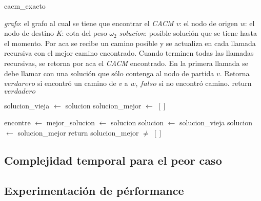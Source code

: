 \begin{algorithm}[!h]
\caption{cacm\_exacto} \label{exacto:pseudo}
\end{algorithm}
\begin{algorithmic}[1]
	\Require \emph{grafo}: el grafo al cual se tiene que encontrar el \emph{CACM}
	\Require \emph{v}: el nodo de origen
	\Require \emph{w}: el nodo de destino
	\Require \emph{K}: cota del peso $\omega_2$
	\Require \emph{solucion}: posible soluci\'on que se tiene hasta el momento. Por aca se recibe un camino posible y se actualiza en cada llamada recursiva con el mejor camino encontrado. Cuando terminen todas las llamadas recursivas, se retorna por aca el \emph{CACM} encontrado. En la primera llamada se debe llamar con una soluci\'on que s\'olo contenga al nodo de partida $v$.
	\Statex
	\Ensure Retorna $verdarero$ si encontr\'o un camino de $v$ a $w$, $falso$ si no encontr\'o camino.
	\Statex
			\State return $verdadero$
		\EndIf
		
		\State solucion\_vieja $\gets$ solucion
		\State solucion\_mejor $\gets$ $[]$

				\State {}
				\State {}
				\State encontre $\gets$ 
					\State mejor\_solucion $\gets$ solucion
				\EndIf
				\State {}
				\State solucion $\gets$ solucion\_vieja
			\EndIf
		\EndFor
			\State solucion $\gets$ solucion\_mejor
		\EndIf
		\State return solucion\_mejor $\neq$ $[]$
	\EndProcedure
\end{algorithmic}

\subsection{Complejidad temporal para el peor caso} \label{exacto:complejidad}

\subsection{Experimentaci\'on de p\'erformance} \label{exacto:experimentacion}

